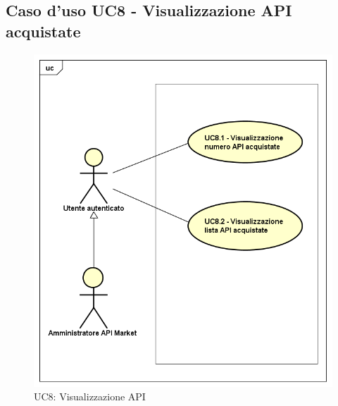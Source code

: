 \newpage
\subsection{Caso d'uso UC8 - Visualizzazione API acquistate}
\label{UC8}
\begin{figure}[ht]
	\centering
	\includegraphics[scale=0.45]{UML/UC8.png}
	\caption{UC8: Visualizzazione API}
\end{figure}

